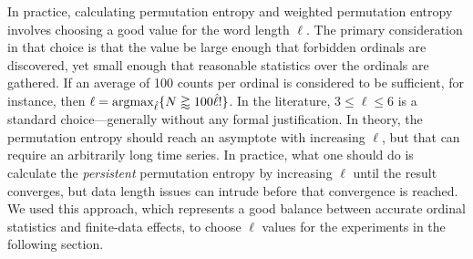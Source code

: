 In practice, calculating permutation entropy and weighted permutation
entropy involves choosing a good value for the word length $\ell$. The
primary consideration in that choice is that the value be large enough
that forbidden ordinals are discovered, yet small enough that
reasonable statistics over the ordinals are gathered.  If an average
of 100 counts per ordinal is considered to be sufficient, for
instance, then $\ell = \operatornamewithlimits{argmax}_{\hat{\ell}} \{
N \gtrapprox 100 \hat{\ell}! \}$.  In the literature, $3 \le \ell \le
6$ is a standard choice---generally without any formal justification.
In theory, the permutation entropy should reach an asymptote with
increasing $\ell$, but that can require an arbitrarily long time
series. In practice, what one should do is calculate the
\emph{persistent} permutation entropy by increasing $\ell$ until the
result converges, but data length issues can intrude before that
convergence is reached.  We used this approach, which represents a
good balance between accurate ordinal statistics and finite-data
effects, to choose $\ell$ values for the experiments in the following
section.  


